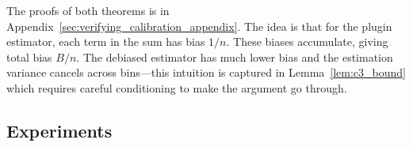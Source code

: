 \begin{theorem}
\label{thm:final-ours}
\finalCancelingText{}
\end{theorem}

\newtheorem*{finalCanceling}{Restatement of Theorem~\ref{thm:final-ours}}


The proofs of both theorems is in Appendix~\ref{sec:verifying_calibration_appendix}. The idea is that for the plugin estimator, each term in the sum has bias $1/n$. These biases accumulate, giving total bias $B/n$. The debiased estimator has much lower bias and the estimation variance cancels across bins---this intuition is captured in Lemma~\ref{lem:c3_bound} which requires careful conditioning to make the argument go through.


\newcommand{\calset}[0]{\ensuremath{S_C}}
\newcommand{\verifset}[0]{\ensuremath{S_E}}

\subsection{Experiments}
\label{sec:verifying_calibration_experiments}


